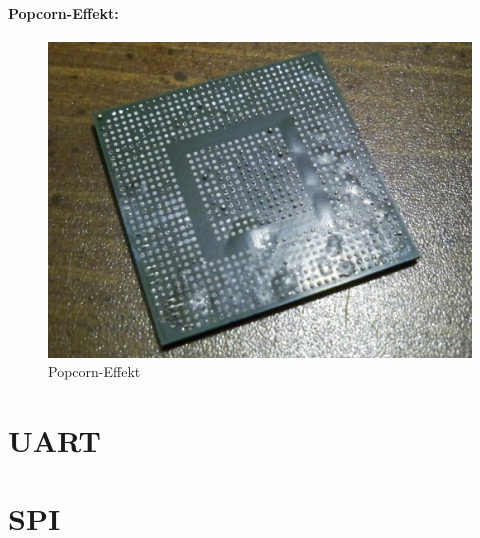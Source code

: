 \paragraph{Popcorn-Effekt:} %
\begin{figure}[H]
	\centering
	\includegraphics[width=.5\linewidth]{images/technische_grundlagen/popcornEffekt.jpg}%
	\caption{Popcorn-Effekt}
\end{figure}
\section{UART}
\section{SPI}